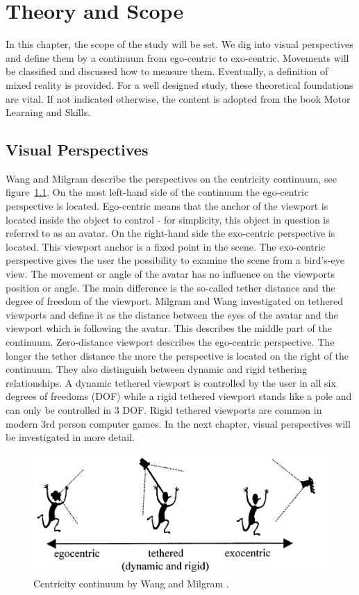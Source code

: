 \chapter{Theory and Scope}
In this chapter, the scope of the study will be set. We dig into visual perspectives and define them by a continuum from ego-centric to exo-centric. Movements will be classified and discussed how to measure them. Eventually, a definition of mixed reality is provided. For a well designed study, these theoretical foundations are vital. If not indicated otherwise, the content is adopted from the book Motor Learning and Skills\cite{Schmidt2011}. 

\section{Visual Perspectives}
Wang and Milgram \cite{Wang2001} describe the perspectives on the centricity continuum, see figure~\ref{fig:ego-exo-cont}. On the most left-hand side of the continuum the ego-centric perspective is located. Ego-centric means that the anchor of the viewport is located inside the object to control - for simplicity, this object in question is referred to as an avatar. On the right-hand side the exo-centric perspective is located. This viewport anchor is a fixed point in the scene. The exo-centric perspective gives the user the possibility to examine the scene from a bird's-eye view. The movement or angle of the avatar has no influence on the viewports position or angle. The main difference is the so-called tether distance and the degree of freedom of the viewport. Milgram and Wang investigated on tethered viewports and define it as the distance between the eyes of the avatar and the viewport which is following the avatar. This describes the middle part of the continuum. Zero-distance viewport describes the ego-centric perspective. The longer the tether distance the more the perspective is located on the right of the continuum. They also distinguish between dynamic and rigid tethering relationships. A dynamic tethered viewport is controlled by the user in all six degrees of freedoms (DOF) while a rigid tethered viewport stands like a pole and can only be controlled in 3 DOF. Rigid tethered viewports are common in modern 3rd person computer games. In the next chapter, visual perspectives will be investigated in more detail.
\begin{figure}
	\centering
	\includegraphics[width=1.0\textwidth]{img/ego_exo_continuum_bigger.PNG}
	\caption{Centricity continuum by Wang and Milgram \cite{Wang2001}.}
	\label{fig:ego-exo-cont}
\end{figure}

